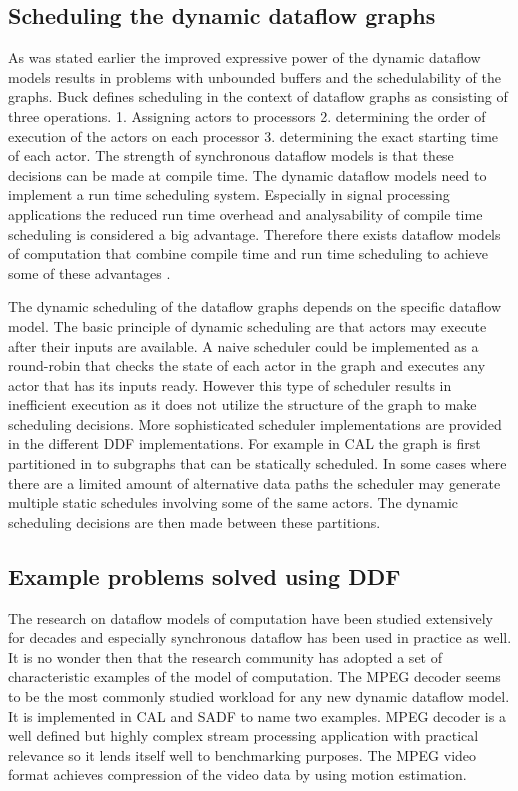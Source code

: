 \documentclass[conference,a4paper]{IEEEtran}
\begin{document}
\subsection{Scheduling the dynamic dataflow graphs}
As was stated earlier the improved expressive power of the dynamic dataflow
models results in problems with unbounded buffers and the schedulability of the
graphs. Buck \cite{buck1993scheduling} defines scheduling in the context of
dataflow graphs as consisting of three operations. 1. Assigning actors to
processors 2. determining the order of execution of the actors on each processor
3. determining the exact starting time of each actor. The strength of
synchronous dataflow models is that these decisions can be made at compile time.
The dynamic dataflow models need to implement a run time scheduling system.
Especially in signal processing applications the reduced run time overhead and
analysability of compile time scheduling is considered a big advantage.
Therefore there exists dataflow models of computation that combine compile time
and run time scheduling to achieve some of these advantages
\cite{buck1993scheduling, bhattacharyya2013handbook}.

The dynamic scheduling of the dataflow graphs depends on the specific dataflow
model. The basic principle of dynamic scheduling are that actors may execute
after their inputs are available. A naive scheduler could be implemented as a
round-robin that checks the state of each actor in the graph and executes any
actor that has its inputs ready. However this type of scheduler results in
inefficient execution as it does not utilize the structure of the graph to make
scheduling decisions. More sophisticated scheduler implementations are provided
in the different DDF implementations. For example in CAL the graph is first
partitioned in to subgraphs that can be statically scheduled. In some cases
where there are a limited amount of alternative data paths the scheduler may
generate multiple static schedules involving some of the same actors. The
dynamic scheduling decisions are then made between these partitions.
\cite{eker2003cal}

\subsection{Example problems solved using DDF}
The research on dataflow models of computation have been studied extensively for
decades and especially synchronous dataflow has been used in practice as well.
It is no wonder then that the research community has adopted a set of
characteristic examples of the model of computation. The MPEG decoder seems to
be the most commonly studied workload for any new dynamic dataflow model. It is
implemented in CAL \cite{eker2003cal} and SADF \cite{bhattacharyya2013handbook}
to name two examples. MPEG decoder is a well defined but highly complex stream
processing application with practical relevance so it lends itself well to
benchmarking purposes. The MPEG video format achieves compression of the video
data by using motion estimation.
\end{document}
